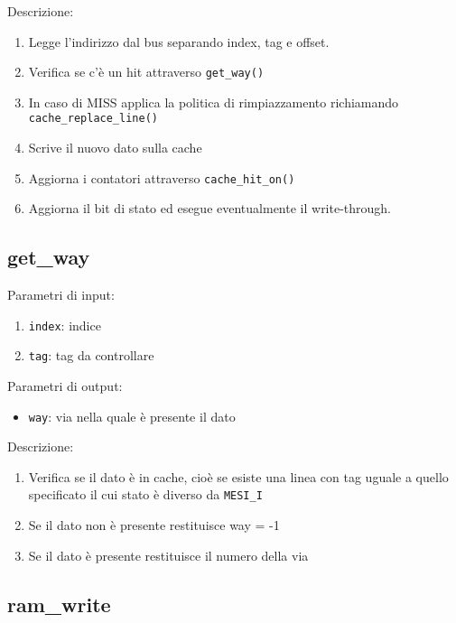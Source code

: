Descrizione:	
\begin{enumerate}
  \item Legge l'indirizzo dal bus separando index, tag e offset. 
  
  \item Verifica se c'\`e un hit attraverso \texttt{get\_way()}
  \item In caso di MISS applica la politica di rimpiazzamento richiamando \texttt{cache\_replace\_line()}
  \item Scrive il nuovo dato sulla cache
  \item Aggiorna i contatori attraverso \texttt{cache\_hit\_on()}
  \item Aggiorna il bit di stato ed esegue eventualmente il write-through.
\end{enumerate}
		


\subsection{get\_way} %

Parametri di input:
\begin{enumerate}
  \item \texttt{index}: indice
  \item \texttt{tag}: tag da controllare
\end{enumerate}	

Parametri di output:
\begin{itemize}
  \item \texttt{way}: via nella quale \`e presente il dato
\end{itemize}

Descrizione:	
\begin{enumerate}
  \item Verifica se il dato \`e in cache, cio\`e se esiste una linea con tag uguale a quello specificato il cui stato \`e diverso da \texttt{MESI\_I}
  \item Se il dato non \`e presente restituisce way = -1
  \item Se il dato \`e presente restituisce il numero della via
\end{enumerate}
	
	
	
\subsection{ram\_write} %


